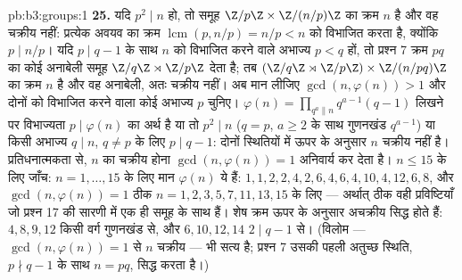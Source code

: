 \begin{solution}{pb:b3:groups:1}
\textbf{25.} यदि $p^2 \mid n$ हो, तो समूह $\Z/p\Z \times
\Z/(n/p)\Z$ का क्रम $n$ है और वह
चक्रीय नहीं: प्रत्येक अवयव का क्रम $\operatorname{lcm}(p, n/p) = n/p < n$ को विभाजित करता है, क्योंकि
$p \mid n/p$। यदि $p \mid
q - 1$ के साथ $n$ को विभाजित करने वाले अभाज्य $p < q$ हों,
तो प्रश्न 7 क्रम $pq$ का कोई अनाबेली समूह $\Z/q\Z \rtimes
\Z/p\Z$ देता है; तब $(\Z/q\Z \rtimes \Z/p\Z) \times
\Z/(n/pq)\Z$
का क्रम $n$ है और वह अनाबेली, अतः चक्रीय नहीं। अब मान लीजिए $\gcd(n, \varphi(n)) > 1$
और दोनों को विभाजित करने वाला कोई अभाज्य $p$ चुनिए। $\varphi(n) = \prod_{q^a \parallel
n} q^{a-1}(q - 1)$ लिखने
पर विभाज्यता $p \mid \varphi(n)$ का अर्थ है या तो $p^2 \mid n$ ($q = p$, $a \geq 2$ के साथ
गुणनखंड $q^{a-1}$) या किसी अभाज्य $q \mid n$, $q
\neq p$ के लिए $p \mid q - 1$: दोनों
स्थितियों में ऊपर के अनुसार $n$ चक्रीय नहीं है। प्रतिधनात्मकता
से, $n$ का चक्रीय होना $\gcd(n, \varphi(n)) = 1$ अनिवार्य कर देता है। $n \leq 15$ के लिए
जाँच: $n = 1,
\dots, 15$ के लिए मान $\varphi(n)$ ये हैं: $1, 1, 2, 2, 4, 2, 6, 4, 6, 4, 10, 4, 12, 6,
8$, और $\gcd(n, \varphi(n)) = 1$ ठीक $n = 1, 2, 3, 5,
7, 11, 13, 15$ के
लिए --- अर्थात् ठीक वही प्रविष्टियाँ जो प्रश्न 17 की सारणी में एक
ही समूह के साथ हैं। शेष क्रम ऊपर के अनुसार अचक्रीय सिद्ध होते हैं:
$4, 8, 9, 12$ किसी वर्ग गुणनखंड से, और $6, 10, 12, 14$ $2 \mid q - 1$ से। (विलोम --- $\gcd(n, \varphi(n)) = 1$ से
$n$ चक्रीय --- भी सत्य है; प्रश्न 7 उसकी पहली अतुच्छ स्थिति, $p \nmid q - 1$
के साथ $n = pq$, सिद्ध करता है।)
\end{solution}

